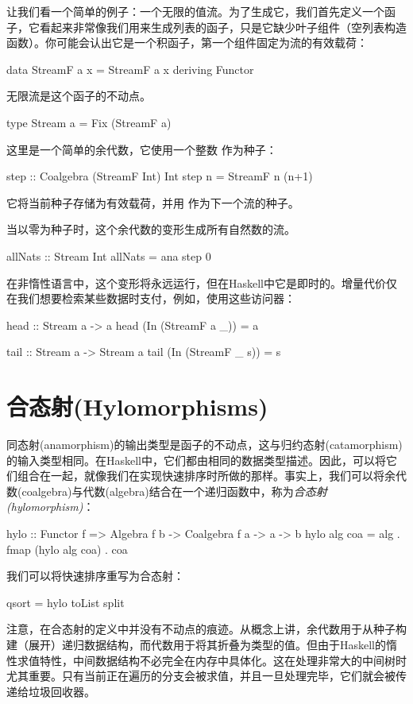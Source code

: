 \documentclass[DaoFP]{subfiles}
\begin{document}
让我们看一个简单的例子：一个无限的值流。为了生成它，我们首先定义一个函子，它看起来非常像我们用来生成列表的函子，只是它缺少叶子组件（空列表构造函数）。你可能会认出它是一个积函子，第一个组件固定为流的有效载荷：
\begin{haskell}
data StreamF a x = StreamF a x
  deriving Functor
\end{haskell}
无限流是这个函子的不动点。
\begin{haskell}
type Stream a = Fix (StreamF a)
\end{haskell}
这里是一个简单的余代数，它使用一个整数  作为种子：
\begin{haskell}
step :: Coalgebra (StreamF Int) Int
step n = StreamF n (n+1)
\end{haskell}
它将当前种子存储为有效载荷，并用  作为下一个流的种子。

当以零为种子时，这个余代数的变形生成所有自然数的流。
\begin{haskell}
allNats :: Stream Int
allNats = ana step 0
\end{haskell}
在非惰性语言中，这个变形将永远运行，但在Haskell中它是即时的。增量代价仅在我们想要检索某些数据时支付，例如，使用这些访问器：
\begin{haskell}
head :: Stream a -> a
head (In (StreamF a _)) = a

tail :: Stream a -> Stream a
tail (In (StreamF _ s)) = s
\end{haskell}

\section{合态射(Hylomorphisms)}

同态射(anamorphism)的输出类型是函子的不动点，这与归约态射(catamorphism)的输入类型相同。在Haskell中，它们都由相同的数据类型描述。因此，可以将它们组合在一起，就像我们在实现快速排序时所做的那样。事实上，我们可以将余代数(coalgebra)与代数(algebra)结合在一个递归函数中，称为\emph{合态射(hylomorphism)}：
\begin{haskell}
hylo :: Functor f => Algebra f b -> Coalgebra f a -> a -> b
hylo alg coa = alg . fmap (hylo alg coa) . coa 
\end{haskell}
我们可以将快速排序重写为合态射：
\begin{haskell}
qsort = hylo toList split
\end{haskell}

注意，在合态射的定义中并没有不动点的痕迹。从概念上讲，余代数用于从种子构建（展开）递归数据结构，而代数用于将其折叠为类型的值。但由于Haskell的惰性求值特性，中间数据结构不必完全在内存中具体化。这在处理非常大的中间树时尤其重要。只有当前正在遍历的分支会被求值，并且一旦处理完毕，它们就会被传递给垃圾回收器。
\end{document}
